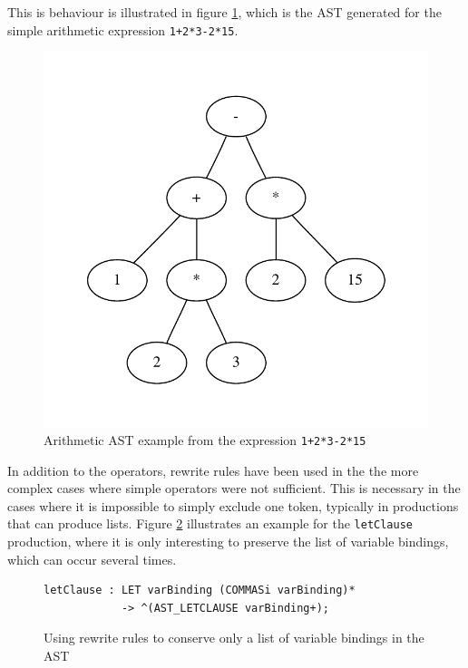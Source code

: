 This is behaviour is illustrated in figure \ref{tree:ast:arithmetic}, which is
the AST generated for the simple arithmetic expression \verb!1+2*3-2*15!.

\begin{figure}[h]
 \includegraphics{img/graphs/arithmetic1}
\caption{Arithmetic AST example from the expression \texttt{1+2*3-2*15}}
\label{tree:ast:arithmetic}
\end{figure}

In addition to the operators, rewrite rules have been used in the the more
complex cases where simple operators were not sufficient. This is necessary in
the cases where it is impossible to simply exclude one token, typically in
productions that can produce lists. Figure \ref{code:ast:rewritelist}
illustrates an example for the \verb!letClause! production, where it is only
interesting to preserve the list of variable bindings, which can occur several
times.

\begin{figure}[h]
\begin{verbatim}
letClause : LET varBinding (COMMASi varBinding)*
            -> ^(AST_LETCLAUSE varBinding+);
\end{verbatim}
\caption[AST rewrite rule for the \texttt{letClause} production rule]{Using
rewrite rules to conserve only a list of variable bindings in the AST}
\label{code:ast:rewritelist}
\end{figure}

